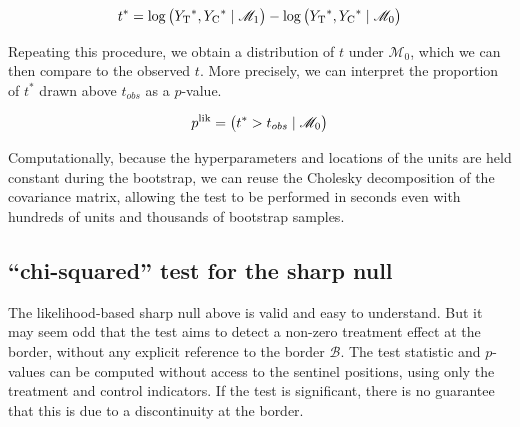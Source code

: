 \documentclass[letter]{article}
\let\Pr\relax
\DeclareMathOperator{\Pr}{\mathbb{P}}
\newcommand{\treat}{\mathrm{T}}
\newcommand{\ctrol}{\mathrm{C}}
\newcommand{\border}{\mathcal{B}}
\newcommand{\modnull}{\mathscr{M}_0}
\newcommand{\modalt}{\mathscr{M}_1}
\begin{document}
\begin{equation}
    t^* = \log \Pr\del{Y_\treat{}^*, Y_\ctrol{}^* \mid \modalt} - \log \Pr\del{Y_\treat{}^*, Y_\ctrol{}^* \mid \modnull}
\end{equation}

Repeating this procedure, we obtain a distribution of \(t\) under \(\modnull\),
which we can then compare to the observed \(t\).
More precisely, we can interpret the proportion of \(t^*\) drawn above \(t_{obs}\) as a \(p\)-value.

\begin{equation}
    p^{\mathrm{lik}} = \Pr\del{t^* > t_{obs} \mid \modnull}
\end{equation}

Computationally, because the hyperparameters and locations of the units are held constant during the bootstrap, we can reuse the Cholesky decomposition of the covariance matrix, allowing the test to be performed in seconds even with hundreds of units and thousands of bootstrap samples.
    


    	\subsection{\texorpdfstring{``chi-squared'' test for the sharp null}{chi-squared test for the sharp null}}\label{chi-squared-test-for-the-sharp-null}

The likelihood-based sharp null above is valid and easy to understand.
But it may seem odd that the test aims to detect a non-zero treatment effect at the border, without any explicit reference to the border \(\border\). The test statistic and \(p\)-values can be computed without access to the sentinel positions, using only the treatment and control indicators. If the test is significant, there is no guarantee that this is due to a discontinuity at the border.
\end{document}
